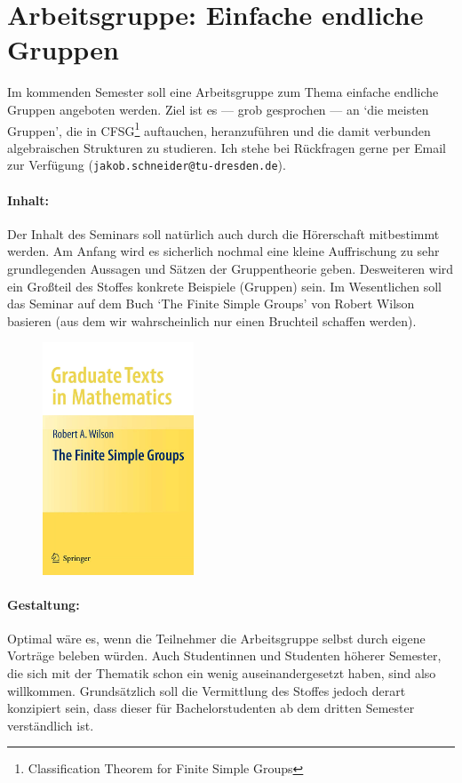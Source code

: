 \documentclass{article}
\begin{document}
\section*{Arbeitsgruppe: Einfache endliche Gruppen}

Im kommenden Semester soll eine Arbeitsgruppe zum Thema einfache endliche Gruppen angeboten werden. Ziel ist es --- grob gesprochen --- an `die meisten Gruppen', die in CFSG\footnote{Classification Theorem for Finite Simple Groups}  auftauchen, heranzuführen und die damit verbunden algebraischen Strukturen zu studieren.
Ich stehe bei Rückfragen gerne per Email zur Verfügung ({\tt jakob.schneider@tu-dresden.de}).

\paragraph{Inhalt:} Der Inhalt des Seminars soll natürlich auch durch die Hörerschaft mitbestimmt werden.
Am Anfang wird es sicherlich nochmal eine kleine Auffrischung zu sehr grundlegenden Aussagen und Sätzen der Gruppentheorie geben.
Desweiteren wird ein Großteil des Stoffes konkrete Beispiele (Gruppen) sein. Im Wesentlichen soll das Seminar auf dem Buch `The Finite Simple Groups' von Robert Wilson
basieren (aus dem wir wahrscheinlich nur einen Bruchteil schaffen werden).

\begin{figure}[htb]
   \centering
   \includegraphics[width=0.4\textwidth]{FSG.jpg}
\end{figure}

\paragraph{Gestaltung:} Optimal wäre es, wenn die Teilnehmer die Arbeitsgruppe selbst durch eigene Vorträge beleben würden.
Auch Studentinnen und Studenten höherer Semester, die sich mit der Thematik schon ein wenig auseinandergesetzt haben, sind also willkommen.
Grundsätzlich soll die Vermittlung des Stoffes jedoch derart konzipiert sein, dass dieser für Bachelorstudenten ab dem dritten Semester verständlich ist.
\end{document}
